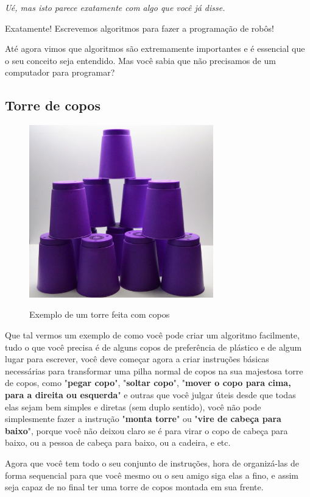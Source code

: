     \textit{Ué, mas isto parece exatamente com algo que você já disse.}  
    
    Exatamente! Escrevemos algoritmos para fazer a programação de robôs! \par 
    Até agora vimos que algoritmos são extremamente importantes e é essencial que o seu conceito seja entendido. Mas você sabia que não precisamos de um computador para programar?
\subsection{Torre de copos}
    \begin{figure}[h]
    \caption{Exemplo de um torre feita com copos}
     
    \centering 
    \includegraphics[width=8cm]{Figuras/torre.jpg}
    \label{figura:torre.jpeg}
    \end{figure}

Que tal vermos um exemplo de como você pode criar um algoritmo facilmente, tudo o que você precisa é de alguns copos de preferência de plástico e de algum lugar para escrever, você deve começar agora a criar instruções básicas necessárias para transformar uma pilha normal de copos na sua majestosa torre de copos, como "\textbf{pegar copo}", "\textbf{soltar copo}", "\textbf{mover o copo para cima, para a direita ou esquerda}" e outras que você julgar úteis desde que todas elas sejam bem simples e diretas (sem duplo sentido), você não pode simplesmente fazer a instrução "\textbf{monta torre}" ou "\textbf{vire de cabeça para baixo}", porque você não deixou claro se é para virar o copo de cabeça para baixo, ou a pessoa de cabeça para baixo, ou a cadeira, e etc.

Agora que você tem todo o seu conjunto de instruções, hora de organizá-las de forma sequencial para que você mesmo ou o seu amigo siga elas a fino, e assim seja capaz de no final ter uma torre de copos montada em sua frente.

